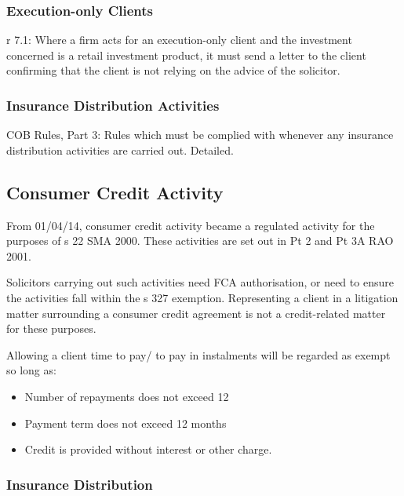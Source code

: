 \documentclass[
]{article}
\providecommand{\tightlist}{%
  \setlength{\itemsep}{0pt}\setlength{\parskip}{0pt}}
\begin{document}
\hypertarget{execution-only-clients}{%
\subsubsection{Execution-only Clients}\label{execution-only-clients}}

r 7.1: Where a firm acts for an execution-only client and the investment
concerned is a retail investment product, it must send a letter to the
client confirming that the client is not relying on the advice of the
solicitor.

\hypertarget{insurance-distribution-activities}{%
\subsubsection{Insurance Distribution
Activities}\label{insurance-distribution-activities}}

COB Rules, Part 3: Rules which must be complied with whenever any
insurance distribution activities are carried out. Detailed.

\hypertarget{consumer-credit-activity}{%
\subsection{Consumer Credit Activity}\label{consumer-credit-activity}}

From 01/04/14, consumer credit activity became a regulated activity for
the purposes of s 22 SMA 2000. These activities are set out in Pt 2 and
Pt 3A RAO 2001.

Solicitors carrying out such activities need FCA authorisation, or need
to ensure the activities fall within the s 327 exemption. Representing a
client in a litigation matter surrounding a consumer credit agreement is
not a credit-related matter for these purposes.

Allowing a client time to pay/ to pay in instalments will be regarded as
exempt so long as:

\begin{itemize}
\tightlist
\item
  Number of repayments does not exceed 12
\item
  Payment term does not exceed 12 months
\item
  Credit is provided without interest or other charge.
\end{itemize}

\hypertarget{insurance-distribution}{%
\subsubsection{Insurance Distribution}\label{insurance-distribution}}
\end{document}
